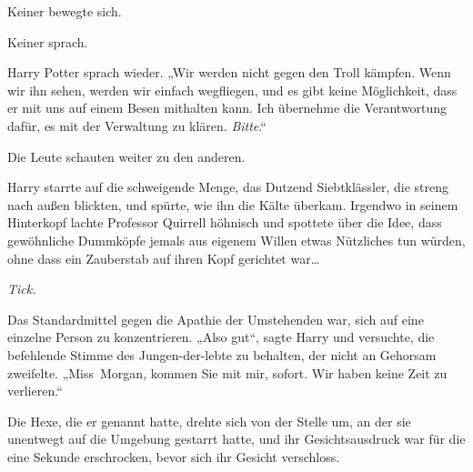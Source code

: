 Keiner bewegte sich.

Keiner sprach.

Harry Potter sprach wieder. „Wir werden nicht gegen den Troll kämpfen. Wenn wir ihn sehen, werden wir einfach wegfliegen, und es gibt keine Möglichkeit, dass er mit uns auf einem Besen mithalten kann. Ich übernehme die Verantwortung dafür, es mit der Verwaltung zu klären. \emph{Bitte}.“

Die Leute schauten weiter zu den anderen.

\later

Harry starrte auf die schweigende Menge, das Dutzend Siebtklässler, die streng nach außen blickten, und spürte, wie ihn die Kälte überkam. Irgendwo in seinem Hinterkopf lachte Professor Quirrell höhnisch und spottete über die Idee, dass gewöhnliche Dummköpfe jemals aus eigenem Willen etwas Nützliches tun würden, ohne dass ein Zauberstab auf ihren Kopf gerichtet war…

\emph{Tick.}

Das Standardmittel gegen die Apathie der Umstehenden war, sich auf eine einzelne Person zu konzentrieren.
„Also gut“, sagte Harry und versuchte, die befehlende Stimme des Jungen-der-lebte zu behalten, der nicht an Gehorsam zweifelte. „Miss~Morgan, kommen Sie mit mir, sofort. Wir haben keine Zeit zu verlieren.“

Die Hexe, die er genannt hatte, drehte sich von der Stelle um, an der sie unentwegt auf die Umgebung gestarrt hatte, und ihr Gesichtsausdruck war für die eine Sekunde erschrocken, bevor sich ihr Gesicht verschloss.


